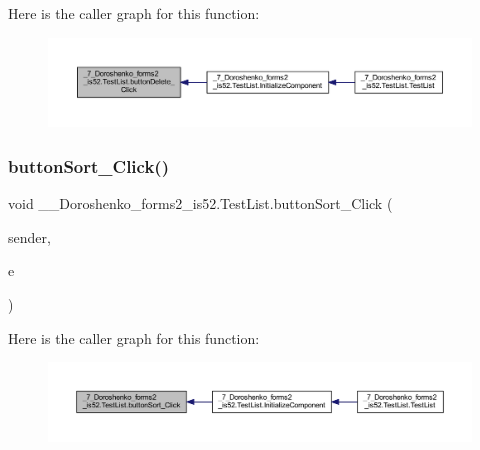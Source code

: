 Here is the caller graph for this function\+:
\nopagebreak
\begin{figure}[H]
\begin{center}
\leavevmode
\includegraphics[width=350pt]{class__7___doroshenko__forms2__is52_1_1_test_list_a161230ed32af2e62e141a8c6e8a4bedd_icgraph}
\end{center}
\end{figure}
\hypertarget{class__7___doroshenko__forms2__is52_1_1_test_list_a2ddc7d64b094c5e6d784633b310201f8}{}\label{class__7___doroshenko__forms2__is52_1_1_test_list_a2ddc7d64b094c5e6d784633b310201f8} 
\subsubsection{\texorpdfstring{button\+Sort\+\_\+\+Click()}{buttonSort\_Click()}}
{\footnotesize\ttfamily void \+\_\+\_\+\+Doroshenko\+\_\+forms2\+\_\+is52.\+Test\+List.\+button\+Sort\+\_\+\+Click (\begin{DoxyParamCaption}\item[{object}]{sender,  }\item[{Event\+Args}]{e }\end{DoxyParamCaption})\hspace{0.3cm}{\ttfamily [private]}}

Here is the caller graph for this function\+:
\nopagebreak
\begin{figure}[H]
\begin{center}
\leavevmode
\includegraphics[width=350pt]{class__7___doroshenko__forms2__is52_1_1_test_list_a2ddc7d64b094c5e6d784633b310201f8_icgraph}
\end{center}
\end{figure}
\hypertarget{class__7___doroshenko__forms2__is52_1_1_test_list_ad8578919a81e70434bb1a87d4def4071}{}\label{class__7___doroshenko__forms2__is52_1_1_test_list_ad8578919a81e70434bb1a87d4def4071} 
